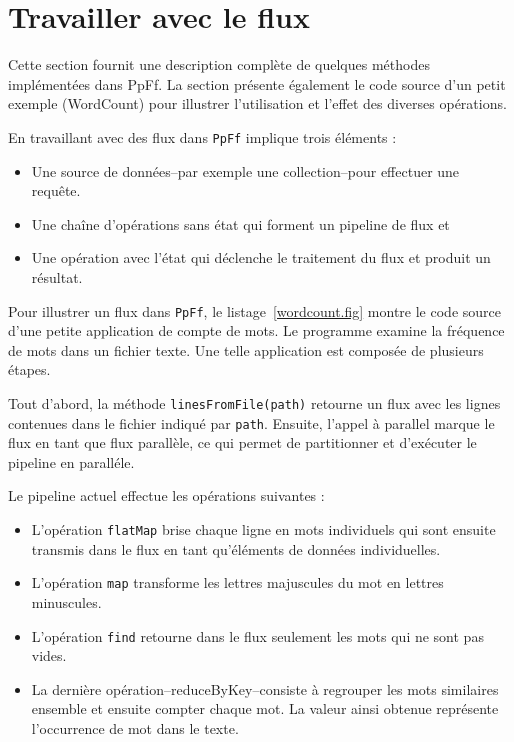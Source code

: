 \section{Travailler avec le flux}

Cette section fournit une description compl\`ete de quelques m\'ethodes impl\'ement\'ees dans PpFf. La section pr\'esente \'egalement le code source d'un petit exemple (WordCount) pour illustrer l'utilisation et l'effet des diverses op\'erations. 

En travaillant avec des flux dans \texttt{PpFf} implique trois \'el\'ements : 
\begin{itemize}
	\item Une source de donn\'ees--par exemple une collection--pour effectuer une requ\^ete.
	\item Une cha\^ine d'op\'erations sans \'etat qui forment un pipeline de flux et
	\item Une op\'eration avec l'\'etat qui d\'eclenche le traitement du flux et produit un r\'esultat.
\end{itemize}

Pour illustrer un flux dans \texttt{PpFf}, le listage~\ref{wordcount.fig} montre le code source d'une petite application de compte de mots. Le programme examine la fr\'equence de mots dans un fichier texte. Une telle application est compos\'ee de plusieurs \'etapes. 

Tout d'abord, la m\'ethode \texttt{linesFromFile(path)}  retourne un flux avec les lignes contenues dans le fichier indiqu\'e par \texttt{path}. Ensuite, l'appel \`a parallel marque le flux en tant que flux parall\`ele, ce qui permet de partitionner et d'ex\'ecuter le pipeline en parall\'ele.

Le pipeline actuel effectue les op\'erations suivantes :
\begin{itemize}
	\item L'op\'eration \texttt{flatMap} brise chaque ligne en mots individuels qui sont ensuite transmis dans le flux en tant qu'\'el\'ements de donn\'ees individuelles.
	\item L'op\'eration \texttt{map} transforme les lettres majuscules du mot en lettres minuscules.
	\item L'op\'eration \texttt{find} retourne dans le flux seulement les mots qui ne sont pas vides.
	\item La derni\`ere op\'eration--reduceByKey--consiste \`a regrouper les mots similaires ensemble et ensuite compter chaque mot. La valeur ainsi obtenue repr\'esente l'occurrence de mot dans le texte. 
\end{itemize}


